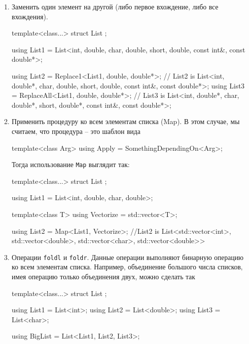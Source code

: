 \begin{enumerate}
\begin{cppcode}
using List2 = NoDuplicates<List1>;
// List2 is List<int, double, char, short, const int&, const double*>;
\end{cppcode}

\item Заменить один элемент на другой (либо первое вхождение, либо все вхождения).
\begin{cppcode}
template<class...>
struct List {};

using List1 = List<int, double, char, double, short, double, const int&, const double*>;

using List2 = Replace1<List1, double, double*>;
// List2 is List<int, double*, char, double, short, double, const int&, const double*>;
using List3 = ReplaceAll<List1, double, double*>;
// List3 is List<int, double*, char, double*, short, double*, const int&, const double*>;
\end{cppcode}

\item Применить процедуру ко всем элементам списка (Map).
В этом случае, мы считаем, что процедура -- это шаблон вида
\begin{cppcode}
template<class Arg>
using Apply = SomethingDependingOn<Arg>;
\end{cppcode}
Тогда использование \verb"Map" выглядит так:
\begin{cppcode}
template<class...>
struct List {};

using List1 = List<int, double, char, double>;

template<class T>
using Vectorize = std::vector<T>;

using List2 = Map<List1, Vectorize>;
//List2 is List<std::vector<int>, std::vector<double>, std::vector<char>, std::vector<double>>
\end{cppcode}

\item Операции \verb"foldl" и \verb"foldr".
Данные операции выполняют бинарную операцию ко всем элементам списка.
Например, объединение большого числа списков, имея операцию только объединения двух, можно сделать так
\begin{cppcode}
template<class...>
struct List {};

using List1 = List<int>;
using List2 = List<double>;
using List3 = List<char>;

using BigList = List<List1, List2, List3>;


\end{cppcode}
\end{enumerate}
